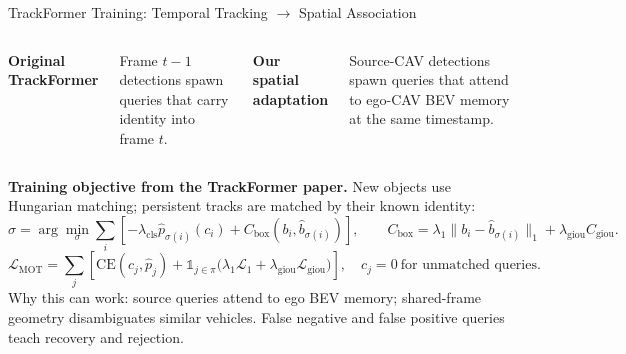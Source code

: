 \documentclass[aspectratio=169,10pt]{beamer}
\begin{document}
\begin{frame}{TrackFormer Training: Temporal Tracking $\rightarrow$ Spatial Association}
\begin{columns}[T,onlytextwidth]
\textbf{Original TrackFormer}\par\vspace{1mm}

\vspace{1mm}\footnotesize
Frame $t-1$ detections spawn queries that carry identity into frame $t$.

\textbf{Our spatial adaptation}\par\vspace{1mm}

\vspace{1mm}\footnotesize
Source-CAV detections spawn queries that attend to ego-CAV BEV memory at the
same timestamp.
\end{columns}

\vspace{2mm}
\footnotesize
\textbf{Training objective from the TrackFormer paper.} New objects use
Hungarian matching; persistent tracks are matched by their known identity:
\[
  \hat\sigma=\arg\min_{\sigma}\sum_i
  \left[-\lambda_{\mathrm{cls}}\hat p_{\sigma(i)}(c_i)+C_{\mathrm{box}}(b_i,\hat b_{\sigma(i)})\right],
  \qquad C_{\mathrm{box}}=\lambda_1\|b_i-\hat b_{\sigma(i)}\|_1+
  \lambda_{\mathrm{giou}}C_{\mathrm{giou}}.
\]
\[
 \mathcal{L}_{\mathrm{MOT}}=\sum_j\left[
 \mathrm{CE}(c_j,\hat p_j)+\mathbb{1}_{j\in\pi}
 \bigl(\lambda_1\mathcal{L}_1+\lambda_{\mathrm{giou}}\mathcal{L}_{\mathrm{giou}}\bigr)\right],
 \quad c_j=0\ \text{for unmatched queries}.
\]
\centering\footnotesize\alert{Why this can work:} source queries attend to ego
BEV memory; shared-frame geometry disambiguates similar vehicles. False
negative and false positive queries teach recovery and rejection.
\end{frame}
\end{document}
